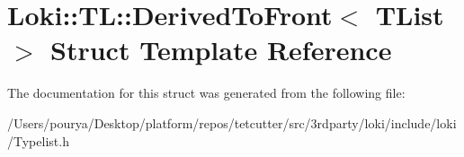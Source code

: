 \hypertarget{structLoki_1_1TL_1_1DerivedToFront}{}\section{Loki\+:\+:T\+L\+:\+:Derived\+To\+Front$<$ T\+List $>$ Struct Template Reference}
\label{structLoki_1_1TL_1_1DerivedToFront}


The documentation for this struct was generated from the following file\+:\begin{DoxyCompactItemize}
\item 
/\+Users/pourya/\+Desktop/platform/repos/tetcutter/src/3rdparty/loki/include/loki/Typelist.\+h\end{DoxyCompactItemize}
